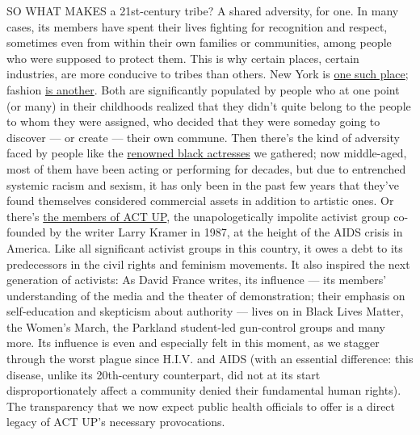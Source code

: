 SO WHAT MAKES a 21st-century tribe? A shared adversity, for one. In many
cases, its members have spent their lives fighting for recognition and
respect, sometimes even from within their own families or communities,
among people who were supposed to protect them. This is why certain
places, certain industries, are more conducive to tribes than others.
New York is
\href{https://www.nytimes3xbfgragh.onion/interactive/2020/04/13/t-magazine/ninth-street-greenwich-village-neighbors.html}{one
such place}; fashion
\href{https://www.nytimes3xbfgragh.onion/interactive/2020/04/13/t-magazine/maria-cornejo-olivier-rousteing-telfar-clemens-alessandro-michele.html}{is
another}. Both are significantly populated by people who at one point
(or many) in their childhoods realized that they didn't quite belong to
the people to whom they were assigned, who decided that they were
someday going to discover --- or create --- their own commune. Then
there's the kind of adversity faced by people like the
\href{https://www.nytimes3xbfgragh.onion/interactive/2020/04/13/t-magazine/black-actresses-bassett-berry-blige-henson-whitfield-elise.html}{renowned
black actresses} we gathered; now middle-aged, most of them have been
acting or performing for decades, but due to entrenched systemic racism
and sexism, it has only been in the past few years that they've found
themselves considered commercial assets in addition to artistic ones. Or
there's
\href{https://www.nytimes3xbfgragh.onion/interactive/2020/04/13/t-magazine/act-up-aids.html}{the
members of ACT UP}, the unapologetically impolite activist group
co-founded by the writer Larry Kramer in 1987, at the height of the AIDS
crisis in America. Like all significant activist groups in this country,
it owes a debt to its predecessors in the civil rights and feminism
movements. It also inspired the next generation of activists: As David
France writes, its influence --- its members' understanding of the media
and the theater of demonstration; their emphasis on self-education and
skepticism about authority --- lives on in Black Lives Matter, the
Women's March, the Parkland student-led gun-control groups and many
more. Its influence is even and especially felt in this moment, as we
stagger through the worst plague since H.I.V. and AIDS (with an
essential difference: this disease, unlike its 20th-century counterpart,
did not at its start disproportionately affect a community denied their
fundamental human rights). The transparency that we now expect public
health officials to offer is a direct legacy of ACT UP's necessary
provocations.

